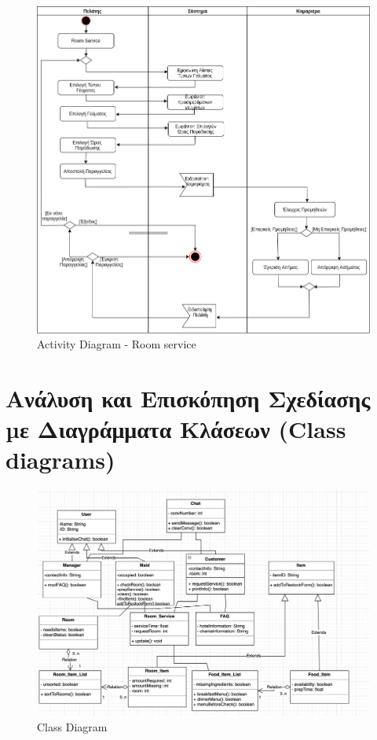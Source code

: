 \begin{figure}[H]
	\centering
	\includegraphics[width=1\textwidth]{Images/Activity-Room service}
		\caption{Activity Diagram - Room service}
		\label{Activity - Room service}
\end{figure}
\clearpage

\section{Ανάλυση και Επισκόπηση Σχεδίασης µε Διαγράμματα Κλάσεων (Class diagrams)}
\begin{figure}[H]
	\centering
	\includegraphics[width=1\textwidth]{Images/class}
	\caption{Class Diagram}
	\label{Class diagram}
\end{figure}
\clearpage

